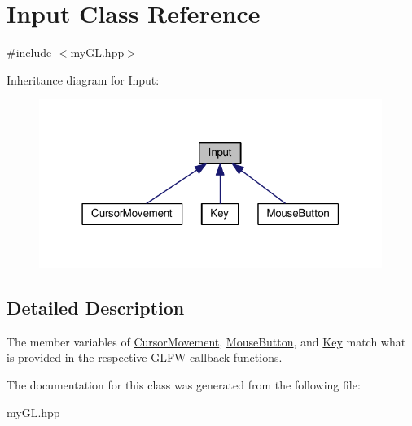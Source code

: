 \hypertarget{classInput}{}\section{Input Class Reference}
\label{classInput}


{\ttfamily \#include $<$my\+G\+L.\+hpp$>$}



Inheritance diagram for Input\+:
\nopagebreak
\begin{figure}[H]
\begin{center}
\leavevmode
\includegraphics[width=316pt]{classInput__inherit__graph}
\end{center}
\end{figure}


\subsection{Detailed Description}
The member variables of \hyperlink{classCursorMovement}{Cursor\+Movement}, \hyperlink{classMouseButton}{Mouse\+Button}, and \hyperlink{classKey}{Key} match what is provided in the respective G\+L\+FW callback functions. 

The documentation for this class was generated from the following file\+:\begin{DoxyCompactItemize}
\item 
my\+G\+L.\+hpp\end{DoxyCompactItemize}
